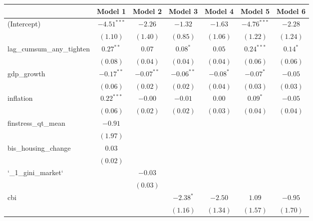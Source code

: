 
\begin{tabular}{l c c c c c c }
\hline
 & Model 1 & Model 2 & Model 3 & Model 4 & Model 5 & Model 6 \\
\hline
(Intercept)               & $-4.51^{***}$ & $-2.26$      & $-1.32$      & $-1.63$     & $-4.76^{***}$ & $-2.28$    \\
                          & $(1.10)$      & $(1.40)$     & $(0.85)$     & $(1.06)$    & $(1.22)$      & $(1.24)$   \\
lag\_cumsum\_any\_tighten & $0.27^{**}$   & $0.07$       & $0.08^{*}$   & $0.05$      & $0.24^{***}$  & $0.14^{*}$ \\
                          & $(0.08)$      & $(0.04)$     & $(0.04)$     & $(0.04)$    & $(0.06)$      & $(0.06)$   \\
gdp\_growth               & $-0.17^{**}$  & $-0.07^{**}$ & $-0.06^{**}$ & $-0.08^{*}$ & $-0.07^{*}$   & $-0.05$    \\
                          & $(0.06)$      & $(0.02)$     & $(0.02)$     & $(0.04)$    & $(0.03)$      & $(0.03)$   \\
inflation                 & $0.22^{***}$  & $-0.00$      & $-0.01$      & $0.00$      & $0.09^{*}$    & $-0.05$    \\
                          & $(0.06)$      & $(0.02)$     & $(0.02)$     & $(0.03)$    & $(0.04)$      & $(0.04)$   \\
finstress\_qt\_mean       & $-0.91$       &              &              &             &               &            \\
                          & $(1.97)$      &              &              &             &               &            \\
bis\_housing\_change      & $0.03$        &              &              &             &               &            \\
                          & $(0.02)$      &              &              &             &               &            \\
`\_1\_gini\_market`       &               & $-0.03$      &              &             &               &            \\
                          &               & $(0.03)$     &              &             &               &            \\
cbi                       &               &              & $-2.38^{*}$  & $-2.50$     & $1.09$        & $-0.95$    \\
                          &               &              & $(1.16)$     & $(1.34)$    & $(1.57)$      & $(1.70)$   \\

\end{tabular}
